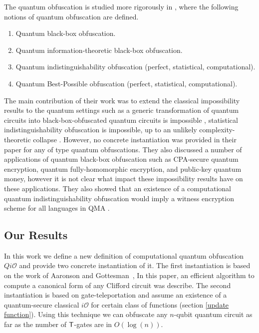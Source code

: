 The quantum obfuscation is studied more rigorously in \cite{AF16arxiv}, where the following notions of quantum obfuscation are defined.
\begin{enumerate}
\item Quantum black-box obfuscation.
\item Quantum information-theoretic black-box obfuscation.
\item Quantum indistinguishability obfuscation (perfect, statistical, computational).
\item Quantum Best-Possible obfuscation (perfect, statistical, computational).
\end{enumerate}

 The main contribution of their work was to extend the classical impossibility results to the quantum settings such as a generic transformation of quantum circuits into black-box-obfuscated quantum circuits is impossible \cite{AF16arxiv},  statistical indistinguishability obfuscation is impossible, up to an unlikely complexity-theoretic collapse \cite{AF16arxiv}. However, no concrete instantiation was provided in their paper for any of type quantum obfuscations. They also discussed a number of applications of quantum black-box obfuscation such as CPA-secure quantum encryption, quantum fully-homomorphic encryption, and public-key quantum money, however it is not clear what impact these impossibility results have on these applications. They also showed that an existence of a computational quantum indistinguishability obfuscation would imply a witness encryption scheme for all languages in QMA  \cite{AF16arxiv}.


\subsection{Our Results}
In this work we define a new definition of computational quantum obfuscation $Qi\mathcal{O}$ and provide two concrete instantiation of it. The first instantiation is based on the work of Aaronson and Gottesman~\cite{AG04}, In this paper, an efficient algorithm to compute a canonical form of any Clifford circuit was describe. The second instantiation is based on gate-teleportation \cite{} and assume an existence of a quantum-secure classical $i\mathcal{O}$ for certain class of functions (section \ref{update function}). Using this technique we can obfuscate any $n$-qubit quantum circuit as far as the number of ${\sf T}$-gates are in $O(\log(n)).$






